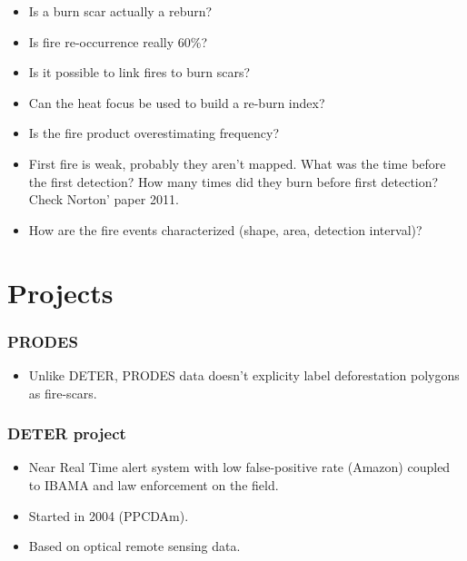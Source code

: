 \documentclass{beamer}
\begin{document}
\begin{frame}[t, allowframebreaks]
\begin{itemize}
\begin{itemize}
            \item Is a burn scar actually a reburn?
            \item Is fire re-occurrence really 60\%?
            \item Is it possible to link fires to burn scars?
            \item Can the heat focus be used to build a re-burn index?
            \item Is the fire product overestimating frequency?
            \item First fire is weak, probably they aren't mapped. What was the 
                time before the first detection? How many times did they burn 
                before first detection? Check Norton' paper 2011.
            \item How are the fire events characterized (shape, area, 
                detection interval)?
        \end{itemize}
    \end{itemize}
\end{frame}



\section{Projects}

\begin{frame}[t, allowframebreaks]
    \frametitle{PRODES}
    \begin{itemize}
        \item Unlike DETER, PRODES data doesn't explicity label deforestation
            polygons as fire-scars.
    \end{itemize}
\end{frame}

\begin{frame}[t, allowframebreaks]
    \frametitle{DETER project}
    \begin{itemize}
        \item Near Real Time alert system with low false-positive rate 
            (Amazon) coupled to IBAMA and law enforcement on the field. 
        \item Started in 2004 (PPCDAm).
        \item Based on optical remote sensing data.
    \end{itemize}
\end{frame}
\end{document}
